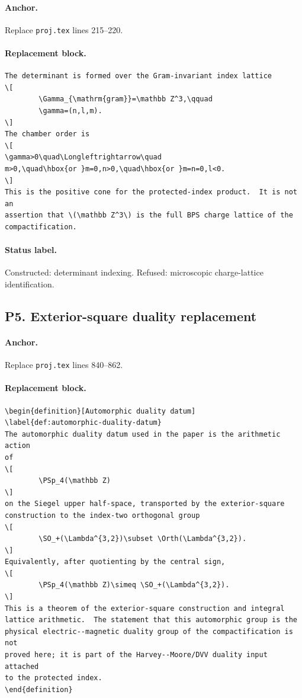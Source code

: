 \paragraph{Anchor.}
Replace \texttt{proj.tex} lines 215--220.

\paragraph{Replacement block.}
\begin{verbatim}
The determinant is formed over the Gram-invariant index lattice
\[
        \Gamma_{\mathrm{gram}}=\mathbb Z^3,\qquad
        \gamma=(n,l,m).
\]
The chamber order is
\[
\gamma>0\quad\Longleftrightarrow\quad
m>0,\quad\hbox{or }m=0,n>0,\quad\hbox{or }m=n=0,l<0.
\]
This is the positive cone for the protected-index product.  It is not an
assertion that \(\mathbb Z^3\) is the full BPS charge lattice of the
compactification.
\end{verbatim}

\paragraph{Status label.}
Constructed: determinant indexing.  Refused: microscopic charge-lattice
identification.

\subsection{P5. Exterior-square duality replacement}

\paragraph{Anchor.}
Replace \texttt{proj.tex} lines 840--862.

\paragraph{Replacement block.}
\begin{verbatim}
\begin{definition}[Automorphic duality datum]
\label{def:automorphic-duality-datum}
The automorphic duality datum used in the paper is the arithmetic action
of
\[
        \PSp_4(\mathbb Z)
\]
on the Siegel upper half-space, transported by the exterior-square
construction to the index-two orthogonal group
\[
        \SO_+(\Lambda^{3,2})\subset \Orth(\Lambda^{3,2}).
\]
Equivalently, after quotienting by the central sign,
\[
        \PSp_4(\mathbb Z)\simeq \SO_+(\Lambda^{3,2}).
\]
This is a theorem of the exterior-square construction and integral
lattice arithmetic.  The statement that this automorphic group is the
physical electric--magnetic duality group of the compactification is not
proved here; it is part of the Harvey--Moore/DVV duality input attached
to the protected index.
\end{definition}
\end{verbatim}

